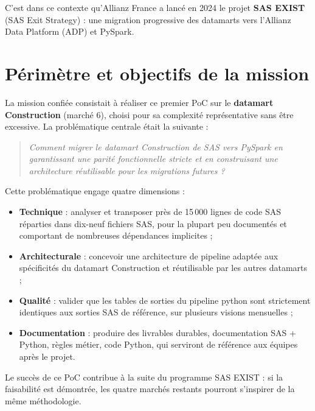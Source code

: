 C'est dans ce contexte qu'Allianz France a lancé en 2024 le projet \textbf{SAS EXIST} (SAS Exit Strategy) : une migration progressive des datamarts vers l'Allianz Data Platform (ADP) et PySpark.

\section{Périmètre et objectifs de la mission}

La mission confiée consistait à réaliser ce premier PoC sur le \textbf{datamart Construction} (marché 6), choisi pour sa complexité représentative sans être excessive. La problématique centrale était la suivante :

\begin{quote}
    \textit{Comment migrer le datamart Construction de SAS vers PySpark en garantissant une parité fonctionnelle stricte et en construisant une architecture réutilisable pour les migrations futures ?}
\end{quote}

Cette problématique engage quatre dimensions :

\begin{itemize}
    \item \textbf{Technique} : analyser et transposer près de 15\,000 lignes de code SAS réparties dans dix-neuf fichiers SAS, pour la plupart peu documentés et comportant de nombreuses dépendances implicites ;
    \item \textbf{Architecturale} : concevoir une architecture de pipeline adaptée aux spécificités du datamart Construction et réutilisable par les autres datamarts ;
    \item \textbf{Qualité} : valider que les tables de sorties du pipeline python sont strictement identiques aux sorties SAS de référence, sur plusieurs visions mensuelles ;
    \item \textbf{Documentation} : produire des livrables durables, documentation SAS + Python, règles métier, code Python, qui serviront de référence aux équipes après le projet.
\end{itemize}

Le succès de ce PoC contribue à la suite du programme SAS EXIST : si la faisabilité est démontrée, les quatre marchés restants pourront s'inspirer de la même méthodologie.
